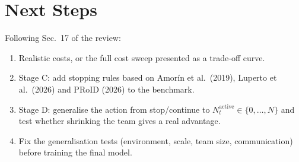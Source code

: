\documentclass[11pt,a4paper]{article}
\begin{document}
\section{Next Steps}

Following Sec.~17 of the review:
\begin{enumerate}
  \item Realistic costs, or the full cost sweep presented as a trade-off curve.
  \item Stage C: add stopping rules based on Amorín et al.\ (2019), Luperto et al.\ (2026) and PRoID (2026) to the benchmark.
  \item Stage D: generalise the action from stop/continue to $N^{\text{active}}_t \in \{0,\dots,N\}$ and test whether shrinking the team gives a real advantage.
  \item Fix the generalisation tests (environment, scale, team size, communication) before training the final model.
\end{enumerate}
\end{document}
